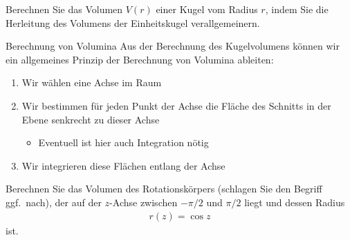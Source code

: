\begin{Aufgabe}
    Berechnen Sie das Volumen $V(r)$ einer Kugel vom Radius $r$, indem Sie die Herleitung des Volumens der Einheitskugel verallgemeinern.
\end{Aufgabe}

\begin{frame}{Berechnung von Volumina}
    Aus der Berechnung des Kugelvolumens können wir ein allgemeines Prinzip der Berechnung von Volumina ableiten:

    \begin{enumerate}
        \item Wir wählen eine \glqq{}Achse\grqq{} im Raum
        \item Wir bestimmen für jeden Punkt der Achse die Fläche des Schnitts in der Ebene senkrecht zu dieser Achse
        \begin{itemize}
            \item Eventuell ist hier auch Integration nötig
        \end{itemize}
        \item Wir integrieren diese Flächen entlang der Achse
    \end{enumerate}
\end{frame}

\begin{Aufgabe}
    Berechnen Sie das Volumen des Rotationskörpers (schlagen Sie den Begriff ggf.\ nach), der auf der $z$-Achse zwischen $-\pi/2$ und $\pi/2$ liegt und dessen Radius
    \begin{gather*}
        r(z) = \cos z
    \end{gather*}
    ist.
\end{Aufgabe}

